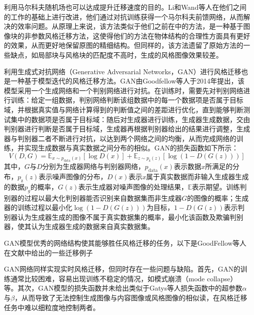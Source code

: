 利用马尔科夫随机场也可以达成提升迁移速度的目的。Li和Wand等人\cite{liPrecomputedRealTimeTexture2016}在他们之间的工作\cite{liCombiningMarkovRandom2016}的基础上进行改进，他们通过对抗训练获得一个马尔科夫前馈网络，从而解决的效率问题。从原理上来说，该方法类似于他们之前在\cite{liCombiningMarkovRandom2016}中的方法，是一种基于图像块的非参数风格迁移方法，这使得他们的方法在物体结构的合理性方面具有更好的效果，从而更好地保留原图的精细结构。但同样的，该方法遗留了原始方法的一些缺点，如局部块与风格块的匹配度不高时，生成的风格图像效果较差。

利用生成式对抗网络（Generative Adversarial Networks，GAN）进行风格迁移也是一种基于模型迭代的风格迁移方法。GAN由Goodfellow等人\cite{goodfellowGenerativeAdversarialNetworks2020}于2014年提出，该模型采用一个生成网络和一个判别网络进行对抗。在训练时，需要先对判别网络进行训练：给定一组数据，判别网络判断该组数据中的每一个数据项是否属于目标域，并根据真实值与网络计算得到的判断值之间的差距进行优化，直到能够判断测试集中的数据项是否属于目标域：随后对生成器进行训练，生成器生成数据，交由判别器进行判断是否属于目标域，生成器再根据判别器给出的结果进行调整，生成器与判别器二者不断进行对抗，以达到两个网络之间的均衡，从而完成网络的训练，并实现生成数据与真实数据之间分布的相似。GAN的损失函数如下所示：
\begin{equation}
    V(D,G)=\mathbb{E}_{x\sim p_{\text{data}}(x)}\left[\log D(x)\right]+\mathbb{E}_{z\sim p_{\text{z}}(z)}\left[\log \left(1-D(G(z))\right)\right]
\end{equation}
其中，$G$与$D$分别为生成器网络与判别器网络，$p_{\text{data}}(x)$表示数据$x$所满足的分布，$ p_{\text{z}}(z)$表示噪声图像的分布，$D(x)$表示$x$属于真实数据而非输入生成器生成的数据$p_g$的概率，$G(z)$表示生成器对噪声图像的处理结果，$\mathbb E$表示期望。训练判别器的过程以最大化判别器能否识别来自数据集而非生成器$G$的图像的概率；生成器的训练过程以最小化$\log \left(1-D(G(z))\right)$为目标，$1-D(G(z))$表示判别器认为生成器生成的图像不属于真实数据集的概率，最小化该函数及欺骗判别器，使其认为生成器生成的数据来自真实数据集。

GAN模型优秀的网络结构使其能够胜任风格迁移的任务，以下是GoodFellow等人在文献\cite{goodfellowGenerativeAdversarialNets2014a}中给出的一些迁移例子%

GAN网络同样实现实时风格迁移，但同时存在一些问题与缺陷。首先，GAN的训练通常比较困难，容易出现训练不稳定的情况，如模式崩溃（mode collapse）等。其次，GAN模型的损失函数并未给出类似于Gatys等人\cite{gatysImageStyleTransfer2016}损失函数中的超参数$\alpha$与$\beta$，从而导致了无法控制生成图像与内容图像或风格图像的相似读，在风格迁移任务中难以细粒度地控制两者。

